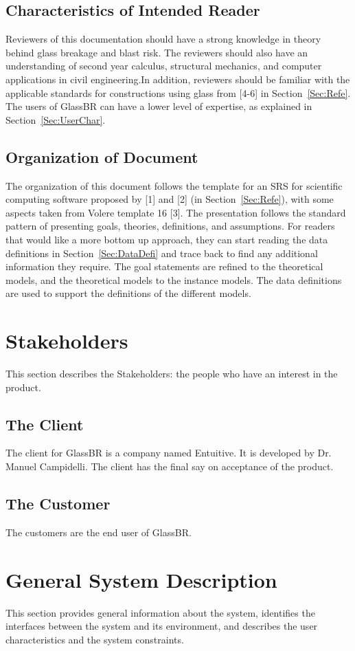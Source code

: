 \documentclass[12pt]{article}
\begin{document}
\subsection{Characteristics of Intended Reader}
\label{Sec:CharofInteRead}
Reviewers of this documentation should have a strong knowledge in theory behind glass breakage and blast risk. The reviewers should also have an understanding of second year calculus, structural mechanics, and computer applications in civil engineering.In addition, reviewers should be familiar with the applicable standards for constructions using glass from {[}4-6{]} in Section~\ref{Sec:Refe}. The users of GlassBR can have a lower level of expertise, as explained in Section~\ref{Sec:UserChar}.
\subsection{Organization of Document}
\label{Sec:OrgaofDocu}
The organization of this document follows the template for an SRS for scientific computing software proposed by {[}1{]} and {[}2{]} (in Section~\ref{Sec:Refe}), with some aspects taken from Volere template 16 {[}3{]}. The presentation follows the standard pattern of presenting goals, theories, definitions, and assumptions. For readers that would like a more bottom up approach, they can start reading the data definitions in Section~\ref{Sec:DataDefi} and trace back to find any additional information they require.
The goal statements are refined to the theoretical models, and the theoretical models to the instance models. The data definitions are used to support the definitions of the different models.
\section{Stakeholders}
\label{Sec:Stak}
This section describes the Stakeholders: the people who have an interest in the product.
\subsection{The Client}
\label{Sec:TheClie}
The client for GlassBR is a company named Entuitive. It is developed by Dr. Manuel Campidelli. The client has the final say on acceptance of the product.
\subsection{The Customer}
\label{Sec:TheCust}
The customers are the end user of GlassBR.
\section{General System Description}
\label{Sec:GeneSystDesc}
This section provides general information about the system, identifies the interfaces between the system and its environment, and describes the user characteristics and the system constraints.
\end{document}
